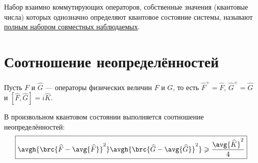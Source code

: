 \begin{defn}
Набор взаимно коммутирующих операторов, собственные значения (квантовые числа) которых однозначно определяют квантовое состояние системы, называют \underline{полным набором совместных наблюдаемых}.
\end{defn}

\section{Соотношение неопределённостей}

Пусть $\widehat{F}$ и $\widehat{G}$ --- операторы физических величин $F$ и $G$, то есть $\widehat{F}^+=\widehat{F}$, $\widehat{G}^+=\widehat{G}$ и $[\widehat{F},\widehat{G}]=i\widehat{K}$.

\begin{thm}
В произвольном квантовом состоянии выполняется соотношение неопределённостей:
$$\boxed{\avgh{\brc{\widehat{F}-\avg{\widehat{F}}}^2} \avgh{\brc{\widehat{G}-\avg{\widehat{G}}}^2} \geqslant \frac{\avg{\widehat{K}}^2}{4}}$$
\end{thm}

